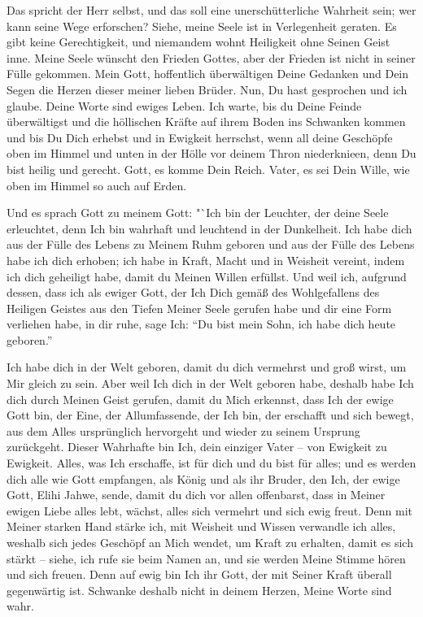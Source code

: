         Das spricht der Herr selbst, und das soll eine unerschütterliche Wahrheit sein; wer kann seine Wege erforschen? Siehe, meine Seele ist in Verlegenheit geraten. Es gibt keine Gerechtigkeit, und niemandem wohnt Heiligkeit ohne Seinen Geist inne. Meine Seele wünscht den Frieden Gottes, aber der Frieden ist nicht in seiner Fülle gekommen. Mein Gott, hoffentlich überwältigen Deine Gedanken und Dein Segen die Herzen dieser meiner lieben Brüder. Nun, Du hast gesprochen und ich glaube. Deine Worte sind ewiges Leben. Ich warte, bis du Deine Feinde überwältigst und die höllischen Kräfte auf ihrem Boden ins Schwanken kommen und bis Du Dich erhebst und in Ewigkeit herrschst, wenn all deine Geschöpfe oben im Himmel und unten in der Hölle vor deinem Thron niederknieen, denn Du bist heilig und gerecht. Gott, es komme Dein Reich. Vater, es sei Dein Wille, wie oben im Himmel so auch auf Erden. 
        
        Und es sprach Gott zu meinem Gott: "`Ich bin der Leuchter, der deine Seele erleuchtet, denn Ich bin wahrhaft und leuchtend in der Dunkelheit. Ich habe dich aus der Fülle des Lebens zu Meinem Ruhm geboren und aus der Fülle des Lebens habe ich dich erhoben; ich habe in Kraft, Macht und in Weisheit vereint, indem ich dich geheiligt habe, damit du Meinen Willen erfüllst. Und weil ich, aufgrund dessen, dass ich als ewiger Gott, der Ich Dich gemäß des Wohlgefallens des Heiligen Geistes aus den Tiefen Meiner Seele gerufen habe und dir eine Form verliehen habe, in dir ruhe, sage Ich: "`Du bist mein Sohn, ich habe dich heute geboren."'
        
        Ich habe dich in der Welt geboren, damit du dich vermehrst und groß wirst, um Mir gleich zu sein. Aber weil Ich dich in der Welt geboren habe, deshalb habe Ich dich durch Meinen Geist gerufen, damit du Mich erkennst, dass Ich der ewige Gott bin, der Eine, der Allumfassende, der Ich bin, der erschafft und sich bewegt, aus dem Alles ursprünglich hervorgeht und wieder zu seinem Ursprung zurückgeht. Dieser Wahrhafte bin Ich, dein einziger Vater -- von Ewigkeit zu Ewigkeit. Alles, was Ich erschaffe, ist für dich und du bist für alles; und es werden dich alle wie Gott empfangen, als König und als ihr Bruder, den Ich, der ewige Gott, Elihi Jahwe, sende, damit du dich vor allen offenbarst, dass in Meiner ewigen Liebe alles lebt, wächst, alles sich vermehrt und sich ewig freut. Denn mit Meiner starken Hand stärke ich, mit Weisheit und Wissen verwandle ich alles, weshalb sich jedes Geschöpf an Mich wendet, um Kraft zu erhalten, damit es sich stärkt -- siehe, ich rufe sie beim Namen an, und sie werden Meine Stimme hören und sich freuen. Denn auf ewig bin Ich ihr Gott, der mit Seiner Kraft überall gegenwärtig ist. Schwanke deshalb nicht in deinem Herzen, Meine Worte sind wahr. 
        

